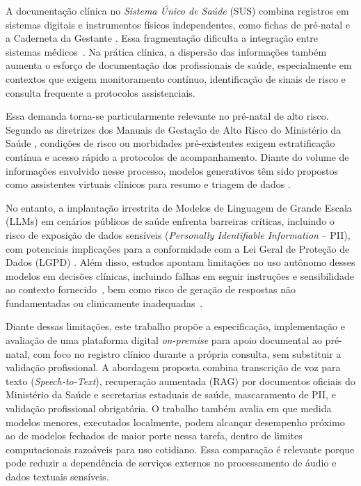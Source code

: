 \documentclass[12pt]{article}
\begin{document}
A documentação clínica no \textit{Sistema Único de Saúde} (SUS) combina registros em sistemas digitais e instrumentos físicos independentes, como fichas de pré-natal e a Caderneta da Gestante \cite{FichaPreNatal2018, CadernetaGestante2024}. Essa fragmentação dificulta a integração entre sistemas médicos~\cite{cifuentes2015electronic}. Na prática clínica, a dispersão das informações também aumenta o esforço de documentação dos profissionais de saúde, especialmente em contextos que exigem monitoramento contínuo, identificação de sinais de risco e consulta frequente a protocolos assistenciais. 

Essa demanda torna-se particularmente relevante no pré-natal de alto risco. Segundo as diretrizes dos Manuais de Gestação de Alto Risco do Ministério da Saúde \cite{ManualAltoRisco2022, ManualAltoRisco2012}, condições de risco ou morbidades pré-existentes exigem estratificação contínua e acesso rápido a protocolos de acompanhamento. Diante do volume de informações envolvido nesse processo, modelos generativos têm sido propostos como assistentes virtuais clínicos para resumo e triagem de dados \cite{Clusmann2023, Rajpurkar2022}.

No entanto, a implantação irrestrita de Modelos de Linguagem de Grande Escala (LLMs) em cenários públicos de saúde enfrenta barreiras críticas, incluindo o risco de exposição de dados sensíveis (\textit{Personally Identifiable Information} -- PII), com potenciais implicações para a conformidade com a Lei Geral de Proteção de Dados (LGPD) \cite{OWASPLLM2025, LGPD2018}. Além disso, estudos apontam limitações no uso autônomo desses modelos em decisões clínicas, incluindo falhas em seguir instruções e sensibilidade ao contexto fornecido~\cite{hager2024evaluation}, bem como risco de geração de respostas não fundamentadas ou clinicamente inadequadas~\cite{asgari2025framework}.

Diante dessas limitações, este trabalho propõe a especificação, implementação e avaliação de uma plataforma digital \textit{on-premise} para apoio documental ao pré-natal, com foco no registro clínico durante a própria consulta, sem substituir a validação profissional. A abordagem proposta combina transcrição de voz para texto (\textit{Speech-to-Text}), recuperação aumentada (RAG) por documentos oficiais do Ministério da Saúde e secretarias estaduais de saúde, mascaramento de PII, e validação profissional obrigatória. O trabalho também avalia em que medida modelos menores, executados localmente, podem alcançar desempenho próximo ao de modelos fechados de maior porte nessa tarefa, dentro de limites computacionais razoáveis para uso cotidiano. Essa comparação é relevante porque pode reduzir a dependência de serviços externos no processamento de áudio e dados textuais sensíveis. 
\end{document}
